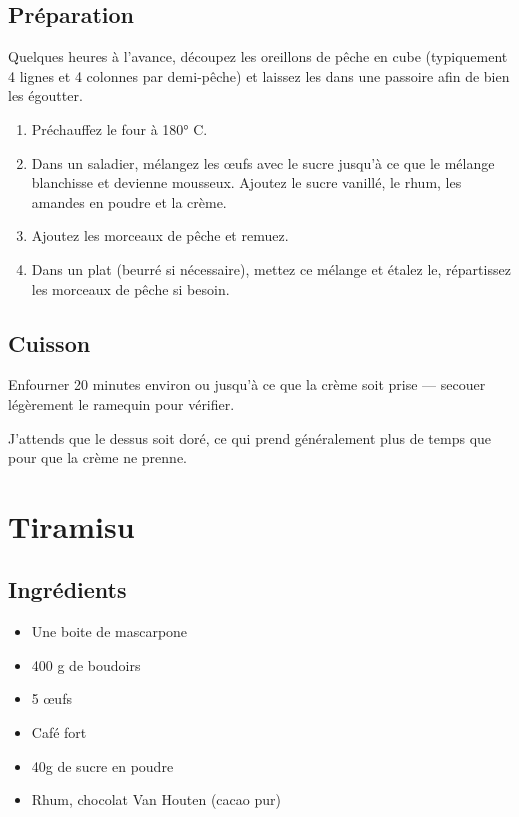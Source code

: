 \subsection*{Préparation}
Quelques heures à l'avance, découpez les oreillons de pêche en cube (typiquement 4 lignes et 4 colonnes par demi-pêche) et laissez les dans une passoire afin de bien les égoutter.

\begin{enumerate}
\item Préchauffez le four à 180° C.
\item Dans un saladier, mélangez les œufs avec le sucre jusqu'à ce que le mélange blanchisse et devienne mousseux. Ajoutez le sucre vanillé, le rhum, les amandes en poudre et la crème. 
\item Ajoutez les morceaux de pêche et remuez.
\item Dans un plat (beurré si nécessaire), mettez ce mélange et étalez le, répartissez les morceaux de pêche si besoin.
\end{enumerate}

\subsection*{Cuisson}
Enfourner 20 minutes environ ou jusqu'à ce que la crème soit prise --- secouer légèrement le ramequin pour vérifier.

\begin{remarque}
J'attends que le dessus soit doré, ce qui prend généralement plus de temps que pour que la crème ne prenne.
\end{remarque}



\newpage
\section{Tiramisu}
\subsection*{Ingrédients}
\begin{itemize}
\item Une boite de mascarpone
\item 400 g de boudoirs
\item 5 œufs
\item Café fort
\item 40g de sucre en poudre
\item Rhum, chocolat Van Houten (cacao pur)
\end{itemize}

